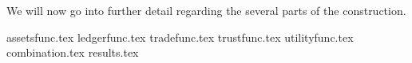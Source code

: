   We will now go into further detail regarding the several parts of the construction.

  {assetsfunc.tex}
  {ledgerfunc.tex}
  {tradefunc.tex}
  {trustfunc.tex}
  {utilityfunc.tex}
  {combination.tex}
  {results.tex}
